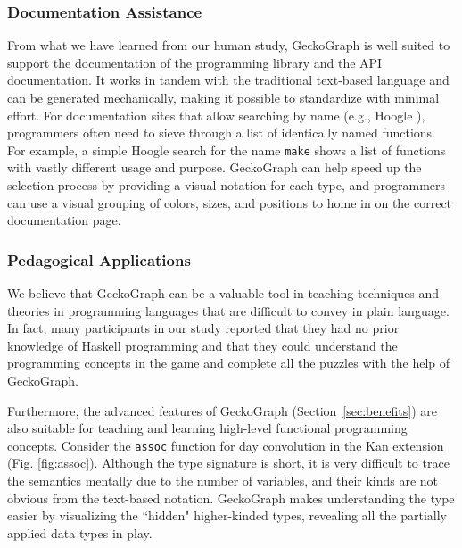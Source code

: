 \subsubsection{Documentation Assistance}
From what we have learned from our human study, GeckoGraph is well suited to support the documentation of the programming library and the API documentation. It works in tandem with the traditional text-based language and can be generated mechanically, making it possible to standardize with minimal effort. For documentation sites that allow searching by name (e.g., Hoogle \cite{Mitchell_undated-fb}), programmers often need to sieve through a list of identically named functions. For example, a simple Hoogle search for the name \texttt{make} shows a list of functions with vastly different usage and purpose. GeckoGraph can help speed up the selection process by providing a visual notation for each type, and programmers can use a visual grouping of colors, sizes, and positions to home in on the correct documentation page.



\subsubsection{Pedagogical Applications}
We believe that GeckoGraph can be a valuable tool in teaching techniques and theories in programming languages that are difficult to convey in plain language. In fact, many participants in our study reported that they had no prior knowledge of Haskell programming and that they could understand the programming concepts in the game and complete all the puzzles with the help of GeckoGraph.

Furthermore, the advanced features of GeckoGraph (Section~\ref{sec:benefits}) are also suitable for teaching and learning high-level functional programming concepts. Consider the \texttt{assoc} function for day convolution \cite{Day1970-kb} in the Kan extension (Fig. \ref{fig:assoc}). Although the type signature is short, it is very difficult to trace the semantics mentally due to the number of variables, and their kinds are not obvious from the text-based notation. GeckoGraph makes understanding the type easier by visualizing the ``hidden" higher-kinded types, revealing all the partially applied data types in play.

